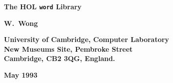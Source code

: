 
\begin{titlepage}

\setcounter{page}{1}                      %


\mbox{}
\vskip20mm
\begin{center}
{\Huge\bf The HOL {\tt word} Library}
\end{center}


\vskip15mm
\begin{center}
\large\bf W.\ Wong
\end{center}


\vfill
\begin{center}
\bf
University of Cambridge, Computer Laboratory\\
New Museums Site, Pembroke Street\\
Cambridge, {\small\bf CB}2 3{\small\bf QG}, England.
\end{center}


\vskip5mm
\begin{center}
\bf May 1993
\end{center}

\end{titlepage}

\thispagestyle{empty}
\mbox{}

